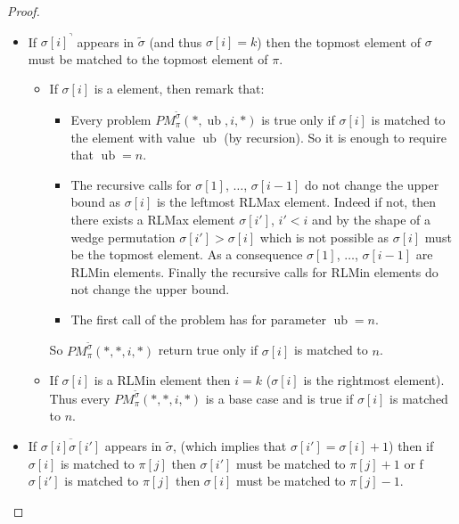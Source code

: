 \documentclass[a4paper]{llncs}
\newcommand{\RLMax}{\text{RLMax}}
\newcommand{\ptext}{\pi}
\newcommand{\ppattern}{\sigma}
\newcommand{\PM}{PM}
\DeclareMathOperator{\ub}{ub}
\begin{document}
\begin{proof}
\begin{itemize}
\begin{itemize}
	\end{itemize}




	\item If ${\ppattern[i]}^\urcorner$ appears in $\widetilde{\sigma}$ (and thus $\sigma[i]=k$) then the topmost element of $\ppattern$ must be matched to the topmost element of $\ptext$.
	\begin{itemize}

		\item If $\sigma[i]$ is a \RLMax element, then remark that:
		\begin{itemize}
			\item Every problem 
			$\PM^{\widetilde{\sigma}}_{\ptext}(*,\ub,i,*)$ is true only if $\sigma[i]$ is matched to the element with value $\ub$ (by recursion).
			So it is enough to require that $\ub=n$.
			\item The recursive calls for $\sigma[1]$, $\ldots$, $\sigma[i-1]$
			do not change the upper bound as
			$\sigma[i]$ is the leftmost RLMax element. Indeed if not, then there exists a RLMax element $\sigma[i']$, $i'<i$ and by the shape of a wedge permutation $\sigma[i']>\sigma[i]$ which is not possible as $\sigma[i]$ must be the topmost element. 
			As a consequence $\sigma[1]$, $\ldots$, $\sigma[i-1]$ are RLMin elements. Finally the recursive calls for RLMin elements do not change the upper bound.
			\item The first call of the problem has for parameter $\ub=n$. 
		\end{itemize} 
		So $\PM^{\widetilde{\sigma}}_{\ptext}(*,*,i,*)$ return true only if 
		$\sigma[i]$ is matched to $n$.
			
		\item If $\sigma[i]$ is a RLMin element then $i=k$ ($\sigma[i]$ is the rightmost element). Thus every $\PM^{\widetilde{\sigma}}_{\ptext}(*,*,i,*)$ is a base case and is true if $\sigma[i]$ is matched to $n$.

	\end{itemize}



	\item  If $\overline{\ppattern[i]\ppattern[i']}$ appears in $\widetilde{\sigma}$,  (which implies that $\ppattern[i']=\ppattern[i]+1$) then if $\ppattern[i]$ is matched to $\ptext[j]$ then $\ppattern[i']$ must be matched to $\ptext[j]+1$
	or f $\ppattern[i']$ is matched to $\ptext[j]$ then $\ppattern[i]$ must be matched to $\ptext[j]-1$.

		\begin{itemize}


\end{itemize}
\end{itemize}
\end{proof}
\end{document}
